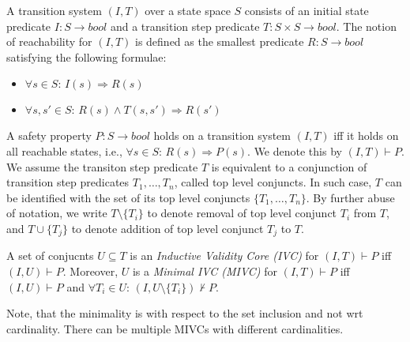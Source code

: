 A transition system $(I,T)$ over a state space $S$ consists of an initial state predicate $I : S \rightarrow bool$ and a transition step predicate $T : S \times S \rightarrow bool$. The notion of reachability for $(I, T)$ is defined as the smallest predicate $R : S \rightarrow bool$ satisfying the following formulae:

\begin{itemize}
	\item[] $\forall s \in S: \, I(s) \Rightarrow R(s)$
	\item[] $\forall s, s' \in S: \, R(s) \wedge T(s, s') \Rightarrow R(s')$
\end{itemize}

A safety property $P: S \rightarrow bool$ holds on a transition system $(I, T)$ iff it holds on all reachable states, i.e., $\forall s \in S: \, R(s) \Rightarrow P(s)$. We denote this by $(I, T) \vdash P$. We assume
the transiton step predicate $T$ is equivalent to   a conjunction of transition step predicates $T_1, \ldots, T_n$,  called top level conjuncts. 
In such case, $T$ can be identified with the set of its top level conjuncts $\{ T_1, \ldots, T_n\}$. By further abuse of notation, we write $T \setminus \{ T_i \}$ to denote removal of top level conjunct $T_i$ from $T$, and $T \cup \{ T_j\}$ to denote addition of top level conjunct $T_j$ to $T$. 


\begin{definition}
A set of conjucnts $U \subseteq T$ is an \emph{ Inductive Validity Core (IVC)} for $(I, T) \vdash P$ iff $(I, U) \vdash P$. Moreover, $U$ is a \emph{Minimal IVC (MIVC)} for $(I, T) \vdash P$ iff $(I, U) \vdash P$ and $\forall T_i \in U: \, (I, U \setminus \{ T_i\}) \nvdash P$.
\end{definition}

Note, that the minimality is with respect to the set inclusion and not wrt cardinality. There can be multiple MIVCs with different cardinalities. 






